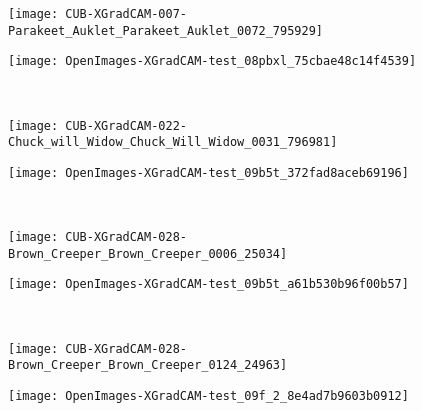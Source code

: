 \documentclass[twocolumn]{article}
\theoremstyle{definition}
\begin{document}
\begin{figure*}
     \begin{subfigure}[b]{0.49\textwidth}
         \centering
         \texttt{[image: CUB-XGradCAM-007-Parakeet\_Auklet\_Parakeet\_Auklet\_0072\_795929]}
     \end{subfigure}
     \hfill
     \begin{subfigure}[b]{0.49\textwidth}
         \centering
         \texttt{[image: OpenImages-XGradCAM-test\_08pbxl\_75cbae48c14f4539]}
     \end{subfigure}
     \\
     \vspace{0.1cm}
     \begin{subfigure}[b]{0.49\textwidth}
         \centering
         \texttt{[image: CUB-XGradCAM-022-Chuck\_will\_Widow\_Chuck\_Will\_Widow\_0031\_796981]}
     \end{subfigure}
     \hfill
     \begin{subfigure}[b]{0.49\textwidth}
         \centering
         \texttt{[image: OpenImages-XGradCAM-test\_09b5t\_372fad8aceb69196]}
     \end{subfigure}
      \\
     \vspace{0.1cm}
     \begin{subfigure}[b]{0.49\textwidth}
         \centering
         \texttt{[image: CUB-XGradCAM-028-Brown\_Creeper\_Brown\_Creeper\_0006\_25034]}
     \end{subfigure}
     \hfill
     \begin{subfigure}[b]{0.49\textwidth}
         \centering
         \texttt{[image: OpenImages-XGradCAM-test\_09b5t\_a61b530b96f00b57]}
     \end{subfigure}
      \\
     \vspace{0.1cm}
     \begin{subfigure}[b]{0.49\textwidth}
         \centering
         \texttt{[image: CUB-XGradCAM-028-Brown\_Creeper\_Brown\_Creeper\_0124\_24963]}
     \end{subfigure}
     \hfill
     \begin{subfigure}[b]{0.49\textwidth}
         \centering
         \texttt{[image: OpenImages-XGradCAM-test\_09f\_2\_8e4ad7b9603b0912]}
     \end{subfigure}
      \\
     \vspace{0.1cm}
     \begin{subfigure}[b]{0.49\textwidth}

\end{subfigure}
\end{figure*}
\end{document}
